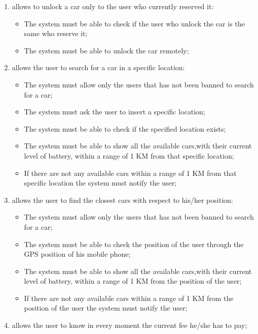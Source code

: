 \begin{enumerate}
\item  allows to unlock a car only to the user who currently reserved it:

\begin{itemize}
	\item The system must be able to check if the user who unlock the car is the same who reserve it;
	\item The system must be able to unlock the car remotely;
\end{itemize}

\item allows the user to search for a car in a specific location:

\begin{itemize}
	\item The system must allow only the users that has not been banned to search for a car;
	\item The system must ask the user to insert a specific location;
	\item The system must be able to check if the specified location exists;
	\item The system must be able to show all the available cars,with their current level of battery, within a range of 1 KM from that specific location;
	\item If there are not any available cars within a range of 1 KM from that specific location the system must notify the user;
\end{itemize}

\item allows the user to find the closest cars with respect to his/her position:

\begin{itemize}
	\item The system must allow only the users that has not been banned to search for a car;
	\item The system must be able to check the position of the user through the GPS position of his mobile phone;
	\item The system must be able to show all the available cars,with their current level of battery, within a range of 1 KM from the position of the user;
	\item If there are not any available cars within a range of 1 KM from the position of the user the system must notify the user;
\end{itemize}

\item allows the user to know in every moment the current fee he/she has to pay;


\end{enumerate}

